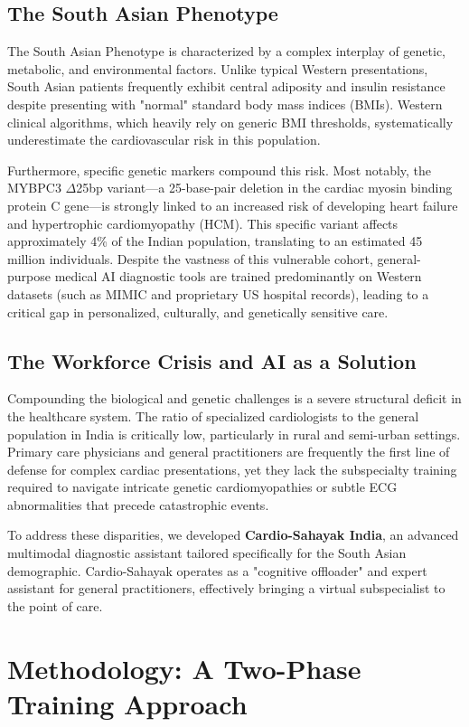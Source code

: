 \documentclass[11pt,a4paper]{article}
\begin{document}
\subsection{The South Asian Phenotype}
The South Asian Phenotype is characterized by a complex interplay of genetic, metabolic, and environmental factors. Unlike typical Western presentations, South Asian patients frequently exhibit central adiposity and insulin resistance despite presenting with "normal" standard body mass indices (BMIs). Western clinical algorithms, which heavily rely on generic BMI thresholds, systematically underestimate the cardiovascular risk in this population. 

Furthermore, specific genetic markers compound this risk. Most notably, the MYBPC3 $\Delta$25bp variant---a 25-base-pair deletion in the cardiac myosin binding protein C gene---is strongly linked to an increased risk of developing heart failure and hypertrophic cardiomyopathy (HCM). This specific variant affects approximately 4\% of the Indian population, translating to an estimated 45 million individuals. Despite the vastness of this vulnerable cohort, general-purpose medical AI diagnostic tools are trained predominantly on Western datasets (such as MIMIC and proprietary US hospital records), leading to a critical gap in personalized, culturally, and genetically sensitive care.

\subsection{The Workforce Crisis and AI as a Solution}
Compounding the biological and genetic challenges is a severe structural deficit in the healthcare system. The ratio of specialized cardiologists to the general population in India is critically low, particularly in rural and semi-urban settings. Primary care physicians and general practitioners are frequently the first line of defense for complex cardiac presentations, yet they lack the subspecialty training required to navigate intricate genetic cardiomyopathies or subtle ECG abnormalities that precede catastrophic events.

To address these disparities, we developed \textbf{Cardio-Sahayak India}, an advanced multimodal diagnostic assistant tailored specifically for the South Asian demographic. Cardio-Sahayak operates as a "cognitive offloader" and expert assistant for general practitioners, effectively bringing a virtual subspecialist to the point of care.

\section{Methodology: A Two-Phase Training Approach}
\end{document}
